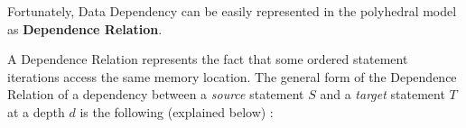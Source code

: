 \documentclass[paper=a4, fontsize=11.5pt]{scrartcl}
\numberwithin{equation}{section}        %
\numberwithin{figure}{section}          %
\numberwithin{table}{section}               %
\begin{document}
        Fortunately, Data Dependency can be easily represented in the polyhedral model as
        \textbf{Dependence Relation}.

        A Dependence Relation represents the fact that some ordered statement iterations
        access the same memory location. The general form of the Dependence Relation of
        a dependency between a \textit{source} statement $S$ and a \textit{target}
        statement $T$ at a depth $d$ is the following (explained below) :

        \begin{center}
\end{center}
\end{document}
